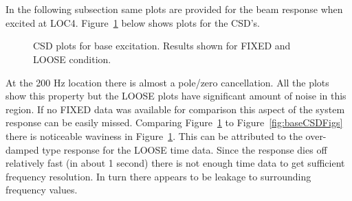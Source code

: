 \documentclass[paper=a4, fontsize=12pt]{scrartcl} %
\begin{document}
%
\\
\\
In the following subsection same plots are provided for the beam response when excited at LOC4. Figure~\ref{fig:LOC4CSDFigs} below shows plots for the CSD's.
%
	\begin{figure}[H]
		\centering
		\quad
		\quad
		\quad
		\caption{CSD plots for base excitation. Results shown for FIXED and LOOSE 					condition.}
		\label{fig:LOC4CSDFigs}
	\end{figure}
%
At the 200 Hz location there is almost a pole/zero cancellation. All the plots show this property but the LOOSE plots have significant amount of noise in this region. If no FIXED data was available for comparison this aspect of the system response can be easily missed. Comparing Figure~\ref{fig:LOC4CSDFigs} to Figure~\ref{fig:baseCSDFigs} there is noticeable waviness in Figure~\ref{fig:LOC4CSDFigs}. This can be attributed to the over-damped type response for the LOOSE time data. Since the response dies off relatively fast (in about 1 second) there is not enough time data to get sufficient frequency resolution. In turn there appears to be leakage to surrounding frequency values.
\end{document}
